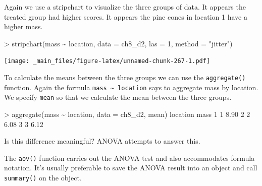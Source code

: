 \documentclass[
]{book}
\newenvironment{Shaded}{\begin{snugshade}}{\end{snugshade}}
\newcommand{\AttributeTok}[1]{\textcolor[rgb]{0.77,0.63,0.00}{#1}}
\newcommand{\DecValTok}[1]{\textcolor[rgb]{0.00,0.00,0.81}{#1}}
\newcommand{\FloatTok}[1]{\textcolor[rgb]{0.00,0.00,0.81}{#1}}
\newcommand{\FunctionTok}[1]{\textcolor[rgb]{0.00,0.00,0.00}{#1}}
\newcommand{\NormalTok}[1]{#1}
\newcommand{\SpecialCharTok}[1]{\textcolor[rgb]{0.00,0.00,0.00}{#1}}
\newcommand{\StringTok}[1]{\textcolor[rgb]{0.31,0.60,0.02}{#1}}
\begin{document}
Again we use a stripchart to visualize the three groups of data. It appears the treated group had higher scores. It appears the pine cones in location 1 have a higher mass.

\begin{Shaded}
\begin{Highlighting}[]
\SpecialCharTok{\textgreater{}} \FunctionTok{stripchart}\NormalTok{(mass }\SpecialCharTok{\textasciitilde{}}\NormalTok{ location, }\AttributeTok{data =}\NormalTok{ ch8\_d2, }\AttributeTok{las =} \DecValTok{1}\NormalTok{, }\AttributeTok{method =} \StringTok{"jitter"}\NormalTok{)}
\end{Highlighting}
\end{Shaded}

\texttt{[image: \_main\_files/figure-latex/unnamed-chunk-267-1.pdf]}

To calculate the means between the three groups we can use the \texttt{aggregate()} function. Again the formula \texttt{mass\ \textasciitilde{}\ location} says to aggregate mass by location. We specify \texttt{mean} so that we calculate the mean between the three groups.

\begin{Shaded}
\begin{Highlighting}[]
\SpecialCharTok{\textgreater{}} \FunctionTok{aggregate}\NormalTok{(mass }\SpecialCharTok{\textasciitilde{}}\NormalTok{ location, }\AttributeTok{data =}\NormalTok{ ch8\_d2, mean)}
\NormalTok{  location mass}
\DecValTok{1}        \DecValTok{1} \FloatTok{8.90}
\DecValTok{2}        \DecValTok{2} \FloatTok{6.08}
\DecValTok{3}        \DecValTok{3} \FloatTok{6.12}
\end{Highlighting}
\end{Shaded}

Is this difference meaningful? ANOVA attempts to answer this.

The \texttt{aov()} function carries out the ANOVA test and also accommodates formula notation. It's usually preferable to save the ANOVA result into an object and call \texttt{summary()} on the object.
\end{document}
